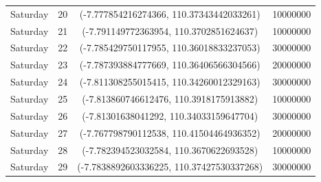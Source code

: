 \documentclass{skripsimathugm}
\begin{document}
\begin{table}[H]
\begin{tabular}{|c|c|c|c|}
Saturday & 20 & (-7.777854216274366, 110.37343442033261) & 10000000 \\
Saturday & 21 & (-7.791149772363954, 110.3702851624637) & 10000000 \\
Saturday & 22 & (-7.785429750117955, 110.36018833237053) & 30000000 \\
Saturday & 23 & (-7.787393884777669, 110.36406566304566) & 20000000 \\
Saturday & 24 & (-7.811308255015415, 110.34260012329163) & 30000000 \\
Saturday & 25 & (-7.813860746612476, 110.3918175913882) & 10000000 \\
Saturday & 26 & (-7.81301638041292, 110.34033159647704) & 30000000 \\
Saturday & 27 & (-7.767798790112538, 110.41504464936352) & 20000000 \\
Saturday & 28 & (-7.782394523032584, 110.3670622693528) & 10000000 \\
Saturday & 29 & (-7.7838892603336225, 110.37427530337268) & 30000000 \\

\hline
\end{tabular}
\end{table}
\end{document}
